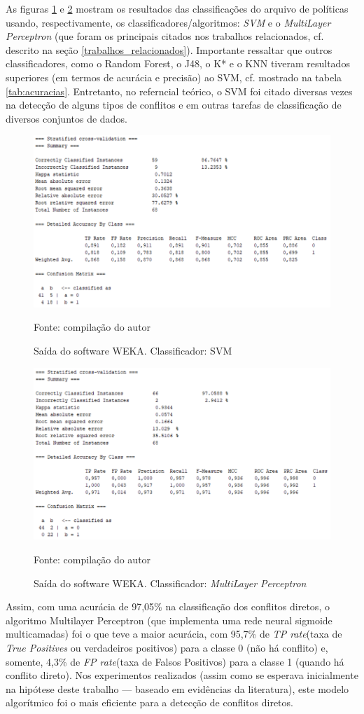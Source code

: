 As figuras \ref{fig:saida_svm} e \ref{fig:saida_multilayerperceptron} mostram os resultados das classificações do arquivo de políticas usando, respectivamente, os classificadores/algoritmos: \textit{SVM} e o \textit{MultiLayer Perceptron} (que foram os principais citados nos trabalhos relacionados, cf. descrito na seção \ref{trabalhos_relacionados}). Importante ressaltar que outros classificadores, como o Random Forest, o J48, o K* e o KNN tiveram resultados superiores (em termos de acurácia e precisão) ao SVM, cf. mostrado na tabela \ref{tab:acuracias}. Entretanto, no referncial teórico, o SVM foi citado diversas vezes na detecção de alguns tipos de conflitos e em outras tarefas de classificação de diversos conjuntos de dados.
\begin{figure}[h!]
	\centering
	\includegraphics[width=.7\textwidth]{imagens/svm-resultados.png}	
	\caption{Saída do software WEKA. Classificador: SVM}
	\label{fig:saida_svm}
	{\scriptsize Fonte: compilação do autor}
\end{figure}
\begin{figure}[h!]
	\centering
	\includegraphics[width=.7\textwidth]{imagens/multilayerperceptron-resultados.png}
	\caption{Saída do software WEKA. Classificador: \textit{MultiLayer Perceptron}}
	\label{fig:saida_multilayerperceptron}
	{\scriptsize Fonte: compilação do autor}
\end{figure}

Assim, com uma acurácia de 97,05\% na classificação dos conflitos diretos, o algoritmo Multilayer Perceptron (que implementa uma rede neural sigmoide multicamadas) foi o que teve a maior acurácia, com 95,7\% de \textit{TP rate}(taxa de \textit{True Positives} ou verdadeiros positivos) para a classe 0 (não há conflito) e, somente, 4,3\% de \textit{FP rate}(taxa de Falsos Positivos) para a classe 1 (quando há conflito direto). Nos experimentos realizados (assim como se esperava inicialmente na hipótese deste trabalho --- baseado em evidências da literatura), este modelo algorítmico foi o mais eficiente para a detecção de conflitos diretos.


